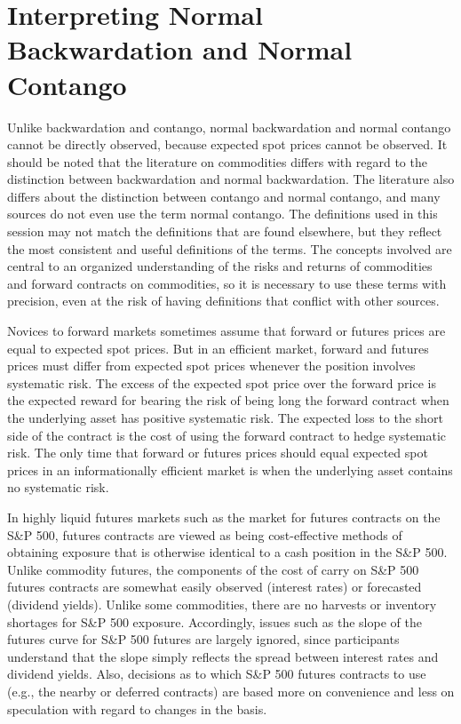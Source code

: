\documentclass[11pt]{article}
\begin{document}
\section*{Interpreting Normal Backwardation and Normal Contango}
Unlike backwardation and contango, normal backwardation and normal contango cannot be directly observed, because expected spot prices cannot be observed. It should be noted that the literature on commodities differs with regard to the distinction between backwardation and normal backwardation. The literature also differs about the distinction between contango and normal contango, and many sources do not even use the term normal contango. The definitions used in this session may not match the definitions that are found elsewhere, but they reflect the most consistent and useful definitions of the terms. The concepts involved are central to an organized understanding of the risks and returns of commodities and forward contracts on commodities, so it is necessary to use these terms with precision, even at the risk of having definitions that conflict with other sources.

Novices to forward markets sometimes assume that forward or futures prices are equal to expected spot prices. But in an efficient market, forward and futures prices must differ from expected spot prices whenever the position involves systematic risk. The excess of the expected spot price over the forward price is the expected reward for bearing the risk of being long the forward contract when the underlying asset has positive systematic risk. The expected loss to the short side of the contract is the cost of using the forward contract to hedge systematic risk. The only time that forward or futures prices should equal expected spot prices in an informationally efficient market is when the underlying asset contains no systematic risk.

In highly liquid futures markets such as the market for futures contracts on the S\&P 500, futures contracts are viewed as being cost-effective methods of obtaining exposure that is otherwise identical to a cash position in the S\&P 500. Unlike commodity futures, the components of the cost of carry on S\&P 500 futures contracts are somewhat easily observed (interest rates) or forecasted (dividend yields). Unlike some commodities, there are no harvests or inventory shortages for S\&P 500 exposure. Accordingly, issues such as the slope of the futures curve for S\&P 500 futures are largely ignored, since participants understand that the slope simply reflects the spread between interest rates and dividend yields. Also, decisions as to which S\&P 500 futures contracts to use (e.g., the nearby or deferred contracts) are based more on convenience and less on speculation with regard to changes in the basis.
\end{document}
